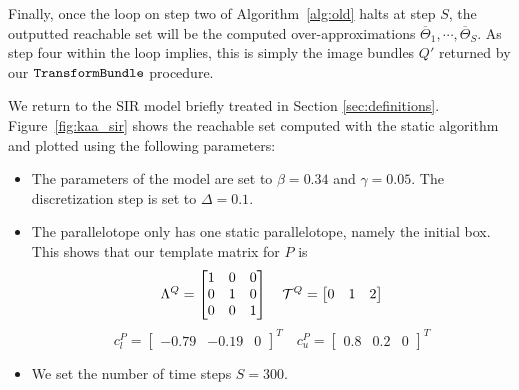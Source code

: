 Finally, once the loop on step two of Algorithm~\ref{alg:old} halts at step $S$, the outputted reachable set will be the computed over-approximations $\overline\Theta_1, \cdots, \overline\Theta_S$. As step four within the loop implies, this is simply the image bundles $Q'$ returned by our $\texttt{TransformBundle}$ procedure.







\begin{example}
  We return to the SIR model briefly treated in Section \ref{sec:definitions}. Figure~\ref{fig:kaa_sir} shows the reachable set computed with the static algorithm and plotted using the following parameters:
  \begin{itemize}
    \item The parameters of the model are set to $\beta = 0.34$ and $\gamma = 0.05$. The discretization step is set to $\Delta = 0.1$.
    \item The parallelotope only has one static parallelotope, namely the initial box. This shows that our template matrix for $P$ is
        \begin{equation*}
          \Lambda^Q = \begin{bmatrix}
                      1 & 0 & 0 \\
                      0 & 1 & 0 \\
                      0 & 0 & 1
                      \end{bmatrix}
                      \quad
          \mathcal{T}^Q = \begin{bmatrix}
                      0 & 1 & 2 \\
                      \end{bmatrix}
        \end{equation*}
        \begin{equation*}
            c_l^P = \begin{bmatrix} -0.79 & -0.19 & 0 \end{bmatrix}^T \quad c_u^P = \begin{bmatrix} 0.8 & 0.2 & 0 \end{bmatrix}^T
        \end{equation*}
    \item We set the number of time steps $S = 300$.
  \end{itemize}


\end{example}
